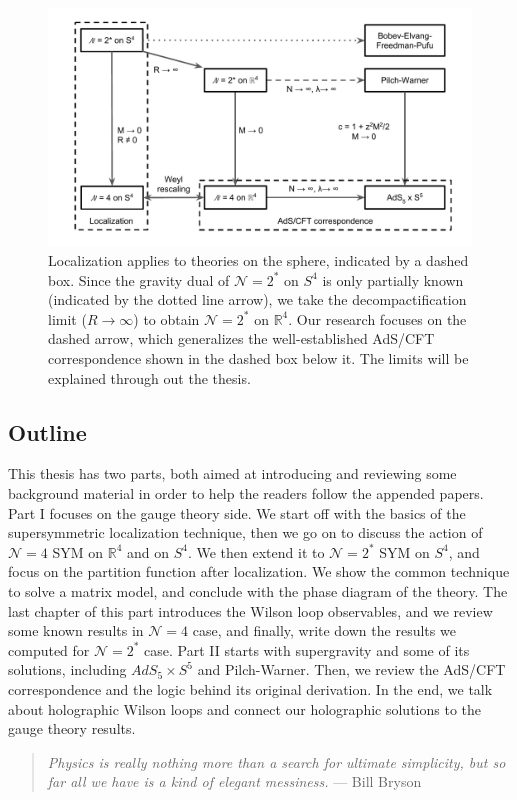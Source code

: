 \begin{figure}[t]
\begin{center}
\includegraphics[width=\textwidth]{Images/Overview.pdf}
\end{center}
\caption{\label{fig:Overview} Localization applies to theories on the sphere, indicated by a dashed box. 
Since the gravity dual of $\mathcal{N}=2^*$ on $S^4$ is only partially known (indicated by the dotted line arrow), 
we take the decompactification limit ($R \rightarrow \infty$) to obtain $\mathcal{N}=2^*$ on $\mathbb{R}^4$.
Our research focuses on the dashed arrow,
which generalizes the well-established AdS/CFT correspondence shown in the dashed box below it. 
The limits will be explained through out the thesis.
}
\end{figure}


\subsection*{Outline}
This thesis has two parts, both aimed at introducing and reviewing some background material in order to help the readers follow the appended papers.  
Part I focuses on the gauge theory side. We start off with the basics of the supersymmetric localization technique, 
then we go on to discuss the action of $\mathcal{N}=4$ SYM on $\mathbb{R}^4$ and on $S^4$. 
We then extend it to $\mathcal{N}=2^*$ SYM on $S^4$, and focus on the partition function after localization. 
We show the common technique to solve a matrix model, and conclude with the phase diagram of the theory. 
The last chapter of this part introduces the Wilson loop observables, and we review some known results in $\mathcal{N}=4$ case, 
and finally, write down the results we computed for $\mathcal{N}=2^*$ case. 
Part II starts with supergravity and some of its solutions, 
including $AdS_5\times S^5$ and Pilch-Warner. 
Then, we review the AdS/CFT correspondence and the logic behind its original derivation. In the end, we talk about holographic Wilson loops and connect our holographic solutions to the gauge theory results. 

\begin{quote}
 \emph{Physics is really nothing more than a search for ultimate simplicity, but so far all we have is a kind of elegant messiness.}
   ---  Bill Bryson
\end{quote} 














